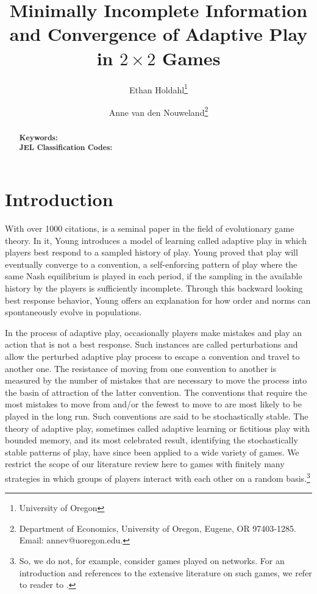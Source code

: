 \documentclass[11.5pt]{article}
\title{Minimally Incomplete Information and Convergence of Adaptive Play in $2\times 2$ Games}
\author{Ethan Holdahl\thanks{University of Oregon} \and Anne van den Nouweland\thanks{Department of Economics, University of Oregon, Eugene, OR 97403-1285. Email: annev@uoregon.edu.}}
\begin{document}
\maketitle 

\begin{abstract}

\noindent \textbf{Keywords:}\\
\noindent \textbf{JEL Classification Codes: } \\

\end{abstract}



%
\newpage

\section{Introduction}
With over 1000 citations, \cite{young1993evolution} is a seminal paper in the field of evolutionary game theory. In it, Young introduces a model of learning called adaptive play in which players best respond to a sampled history of play. Young proved that play will eventually converge to a convention, a self-enforcing pattern of play where the same Nash equilibrium is played in each period, if the sampling in the available history by the players is sufficiently incomplete. Through this backward looking best response behavior, Young offers an explanation for how order and norms can spontaneously evolve in populations.

In the process of adaptive play, occasionally players make mistakes and play an action that is not a best response. Such instances are called perturbations and allow the perturbed adaptive play process to escape a convention and travel to another one. The resistance of moving from one convention to another is measured by the number of mistakes that are necessary to move the process into the basin of attraction of the latter convention. The conventions that require the most mistakes to move from and/or the fewest to move to are most likely to be played in the long run. Such conventions are said to be stochastically stable. The theory of adaptive play, sometimes called adaptive learning or fictitious play with bounded memory, and its most celebrated result, identifying the 
stochastically stable patterns of play, have since been applied to a wide variety of games. We restrict the scope of our literature review here to games with finitely many strategies 
in which groups of players interact with each other on a random basis.\footnote{So, we do not, for example, consider games played on networks. For an introduction and references to the extensive  literature on such games, we refer to reader to \cite{WALLACE2015327}.
}
\end{document}
